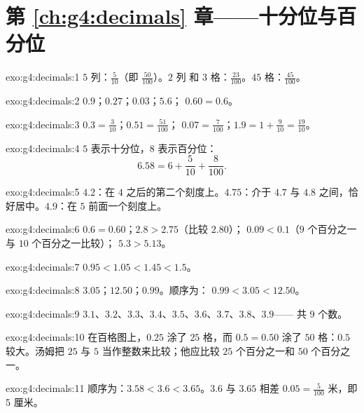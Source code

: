 \section*{第 \ref{ch:g4:decimals} 章——十分位与百分位}

\begin{solution}{exo:g4:decimals:1}
$5$ 列：$\frac{5}{10}$（即 $\frac{50}{100}$）。$2$ 列
和 $3$ 格：$\frac{23}{100}$。$45$ 格：$\frac{45}{100}$。
\end{solution}

\begin{solution}{exo:g4:decimals:2}
$0.9$；\quad $0.27$；\quad $0.03$；\quad $5.6$；\quad
$0.60 = 0.6$。
\end{solution}

\begin{solution}{exo:g4:decimals:3}
$0.3 = \frac{3}{10}$；\quad $0.51 = \frac{51}{100}$；\quad
$0.07 = \frac{7}{100}$；\quad $1.9 = 1 + \frac{9}{10} =
\frac{19}{10}$。
\end{solution}

\begin{solution}{exo:g4:decimals:4}
$5$ 表示十分位，$8$ 表示百分位：
\[
6.58 = 6 + \frac{5}{10} + \frac{8}{100}.
\]
\end{solution}

\begin{solution}{exo:g4:decimals:5}
$4.2$：在 $4$ 之后的第二个刻度上。$4.75$：介于
$4.7$ 与 $4.8$ 之间，恰好居中。$4.9$：在 $5$ 前面一个刻度上。
\end{solution}

\begin{solution}{exo:g4:decimals:6}
$0.6 = 0.60$；\quad $2.8 > 2.75$（比较 $2.80$）；\quad
$0.09 < 0.1$（$9$ 个百分之一与 $10$ 个百分之一比较）；\quad
$5.3 > 5.13$。
\end{solution}

\begin{solution}{exo:g4:decimals:7}
$0.95 < 1.05 < 1.45 < 1.5$。
\end{solution}

\begin{solution}{exo:g4:decimals:8}
$3.05$；\quad $12.50$；\quad $0.99$。顺序为：
$0.99 < 3.05 < 12.50$。
\end{solution}

\begin{solution}{exo:g4:decimals:9}
$3.1$、$3.2$、$3.3$、$3.4$、$3.5$、$3.6$、$3.7$、$3.8$、$3.9$——
共 9 个数。
\end{solution}

\begin{solution}{exo:g4:decimals:10}
在百格图上，$0.25$ 涂了 $25$ 格，而 $0.5 = 0.50$
涂了 $50$ 格：$0.5$ 较大。汤姆把 $25$ 与
$5$ 当作整数来比较；他应比较 $25$ 个百分之一和 $50$ 个百分之一。
\end{solution}

\begin{solution}{exo:g4:decimals:11}
顺序为：$3.58 < 3.6 < 3.65$。$3.6$ 与 $3.65$ 相差
$0.05 = \frac{5}{100}$ 米，即 5 厘米。
\end{solution}
